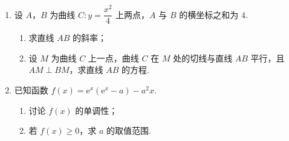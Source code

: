 \begin{description}
\begin{enumerate}[leftmargin=5pt]
经计算得 \(\bar x=\dfrac{1}{16}\sum_{i=1}^{16}x_i=9.97\)，\(s=\sqrt{\dfrac{1}{16}\sum_{i=1}^{16}(x_i-\bar x)^2}=\sqrt{\dfrac{1}{16}\left(\sum_{i=1}^{16}x_i^2-16\bar x^2\right)}\approx0.212\)，\(\sqrt{\sum_{i=1}^{16}(i-8.5)^2}\approx18.439\)，\(\sum_{i=1}^{16}(x_i-\bar x)(i-8.5)=-2.78\)，其中 \(x_i\) 为抽取的第 \(i\) 个零件的尺寸，\(i=1,2,\dots,16\).

\begin{enumerate}
\item 求 \((x_i,i)\)（\(i=1,2,\dots,16\)）的相关系数 \(r\)，并回答是否可以认为这一天生产的零件尺寸不随生产过程的进行而系统地变大或变小（若 \(|r|<0.25\)，则可以认为零件的尺寸不随生产过程的进行而系统地变大或变小）；
\item 一天内抽检零件中，如果出现了尺寸在 \((\bar x-3s,\bar x+3s)\) 之外的零件，就认为这条生产线在这一天的生产过程可能出现了异常情况，需对当天的生产过程进行检查.

\begin{enumerate}
\item 从这一天抽检的结果看，是否需对当天的生产过程进行检查？
\item 在 \((\bar x-3s,\bar x+3s)\) 之外的数据称为离群值，试剔除离群值，估计这条生产线当天生产的零件尺寸的均值与标准差（精确到 \(0.01\)）.
\end{enumerate}
\end{enumerate}

附：样本 \((x_i,y_i)\)（\(i=1,2,\dots,n\)）的相关系数
\(r=\dfrac{\sum_{i=1}^{n}(x_i-\bar x)(y_i-\bar y)}{\sqrt{\sum_{i=1}^{n}(x_i-\bar x)^2\sum_{i=1}^{n}(y_i-\bar y)^2}}\)，\(\sqrt{0.008}\approx0.09\).

        \item 设 \(A\)，\(B\) 为曲线 \(C:y=\dfrac{x^2}{4}\) 上两点，\(A\) 与 \(B\) 的横坐标之和为 \(4\).

\begin{enumerate}
\item 求直线 \(AB\) 的斜率；
\item 设 \(M\) 为曲线 \(C\) 上一点，曲线 \(C\) 在 \(M\) 处的切线与直线 \(AB\) 平行，且 \(AM\perp BM\)，求直线 \(AB\) 的方程.
\end{enumerate}

        \item 已知函数 \(f(x)={\mathrm{e}}^x({\mathrm{e}}^x-a)-a^2x\).

\begin{enumerate}
\item 讨论 \(f(x)\) 的单调性；
\item 若 \(f(x)\ge 0\)，求 \(a\) 的取值范围.
\end{enumerate}

    \end{enumerate}

\end{description}

